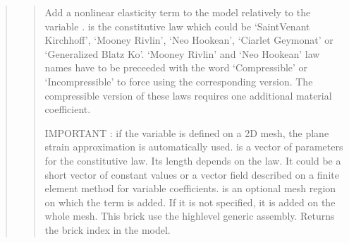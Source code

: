 \documentclass[a4paper,11pt,english]{sphinxmanual}
\begin{document}
\begin{quote}
\sphinxAtStartPar
{}
\begin{quote}

\sphinxAtStartPar
Add a nonlinear elasticity term to the model relatively to the
variable .  is the constitutive law which
could be ‘SaintVenant Kirchhoff’, ‘Mooney Rivlin’, ‘Neo Hookean’,
‘Ciarlet Geymonat’ or ‘Generalized Blatz Ko’.
‘Mooney Rivlin’ and ‘Neo Hookean’ law names have to be preceeded with
the word ‘Compressible’ or ‘Incompressible’ to force using the
corresponding version.
The compressible version of these laws requires one additional material
coefficient.

\sphinxAtStartPar
IMPORTANT : if the variable is defined on a 2D mesh, the plane strain
approximation is automatically used.
 is a vector of parameters for the constitutive law. Its length
depends on the law. It could be a short vector of constant values or a
vector field described on a finite element method for variable
coefficients.  is an optional mesh region on which the term
is added. If it is not specified, it is added on the whole mesh.
This brick use the high\sphinxhyphen{}level generic assembly.
Returns the brick index in the model.
\end{quote}

\sphinxAtStartPar
{}
\begin{quote}


\end{quote}
\end{quote}
\end{document}
